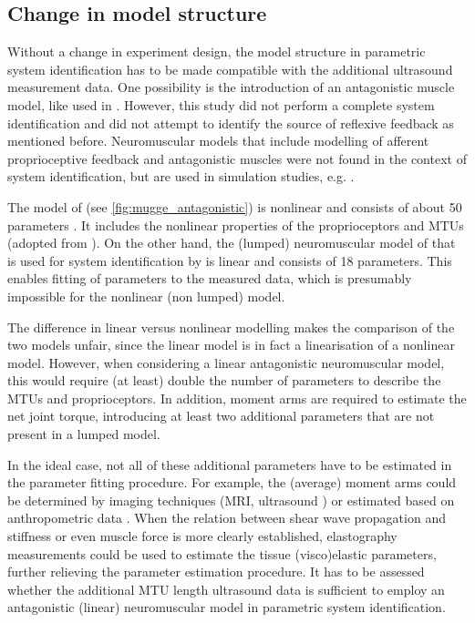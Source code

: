 \subsection{Change in model structure}
\label{sec:change_model_structure}
Without a change in experiment design, the model structure in parametric system identification has to be made compatible with the additional ultrasound measurement data. One possibility is the introduction of an antagonistic muscle model, like used in \cite{de_gooijer-van_de_groep_estimation_2016}. However, this study did not perform a complete system identification and did not attempt to identify the source of reflexive feedback as mentioned before. Neuromuscular models that include modelling of afferent proprioceptive feedback and antagonistic muscles were not found in the context of system identification, but are used in simulation studies, e.g. \cite{munts_fixed_2011, mugge_modeling_2012}. 

The model of \citeauthor{mugge_modeling_2012} (see \autoref{fig:mugge_antagonistic}) is nonlinear and consists of about 50 parameters \cite{mugge_modeling_2012}. It includes the nonlinear properties of the proprioceptors and MTUs (adopted from \cite{winters_analysis_1985, stroeve_neuromuscular_1998}). On the other hand, the (lumped) neuromuscular model of \citet{schouten_nmclab_2008} that is used for system identification by \citet{mugge_rigorous_2010} is linear and consists of 18 parameters. This enables fitting of parameters to the measured data, which is presumably impossible for the nonlinear (non lumped) model. 

The difference in linear versus nonlinear modelling makes the comparison of the two models unfair, since the linear model is in fact a linearisation of a nonlinear model. However, when considering a linear antagonistic neuromuscular model, this would require (at least) double the number of parameters to describe the MTUs and proprioceptors. In addition, moment arms are required to estimate the net joint torque, introducing at least two additional parameters that are not present in a lumped model.

In the ideal case, not all of these additional parameters have to be estimated in the parameter fitting procedure. For example, the (average) moment arms could be determined by imaging techniques (MRI, ultrasound \cite{fath_direct_2010}) or estimated based on anthropometric data \cite{ramsay_muscle_2009}. When the relation between shear wave propagation and stiffness or even muscle force is more clearly established, elastography measurements could be used to estimate the tissue (visco)elastic parameters, further relieving the parameter estimation procedure. It has to be assessed whether the additional MTU length ultrasound data is sufficient to employ an antagonistic (linear) neuromuscular model in parametric system identification. 

